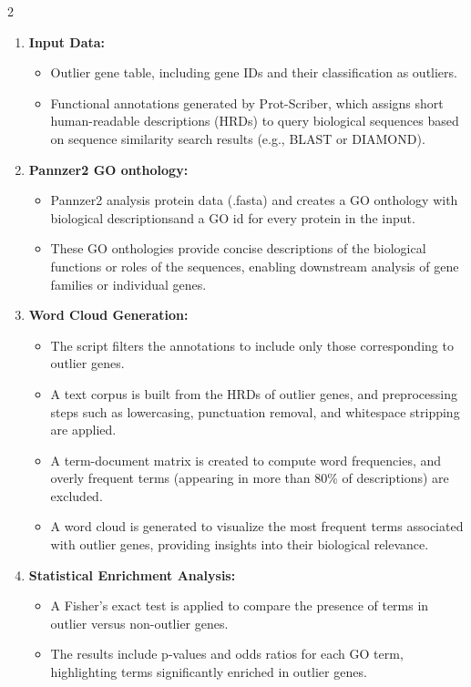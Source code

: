 2\documentclass{article}
\begin{document}
\begin{enumerate}
    \item \textbf{Input Data:}
    \begin{itemize}
        \item Outlier gene table, including gene IDs and their classification as outliers.
        \item Functional annotations generated by Prot-Scriber, which assigns short human-readable descriptions (HRDs) to query biological sequences based on sequence similarity search results (e.g., BLAST or DIAMOND).
    \end{itemize}

    \item \textbf{Pannzer2 GO onthology:}
    \begin{itemize}
        \item Pannzer2 analysis protein data (.fasta) and creates a GO onthology with biological descriptionsand a GO id for every protein in the input.
        \item These GO onthologies provide concise descriptions of the biological functions or roles of the sequences, enabling downstream analysis of gene families or individual genes.
    \end{itemize}

    \item \textbf{Word Cloud Generation:}
    \begin{itemize}
        \item The script filters the annotations to include only those corresponding to outlier genes.
        \item A text corpus is built from the HRDs of outlier genes, and preprocessing steps such as lowercasing, punctuation removal, and whitespace stripping are applied.
        \item A term-document matrix is created to compute word frequencies, and overly frequent terms (appearing in more than 80\% of descriptions) are excluded.
        \item A word cloud is generated to visualize the most frequent terms associated with outlier genes, providing insights into their biological relevance.
    \end{itemize}

    \item \textbf{Statistical Enrichment Analysis:}
    \begin{itemize}
        \item A Fisher's exact test is applied to compare the presence of terms in outlier versus non-outlier genes.
        \item The results include p-values and odds ratios for each GO term, highlighting terms significantly enriched in outlier genes.
    \end{itemize}


\end{enumerate}
\end{document}
